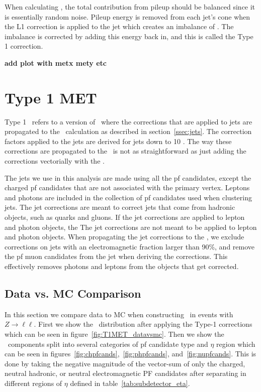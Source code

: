 When calculating \MET, the total contribution from pileup should be balanced since it is essentially random noise.
Pileup energy is removed from each jet's cone when the L1 correction is applied to the jet which creates an imbalance of \MET.
The imbalance is corrected by adding this energy back in, and this is called the Type 1 correction.

{\bf add plot with metx mety etc}

\section{Type 1 MET}
\label{sec:t1met}
Type 1 \MET\ refers to a version of \MET\ where the corrections that are applied to jets are propagated to the \MET\ calculation as described in section~\ref{ssec:jets}.
The correction factors applied to the jets are derived for jets down to 10 \gev.
The way these corrections are propagated to the \MET\ is not as straightforward as just adding the corrections vectorially with the \MET.

The jets we use in this analysis are made using all the pf candidates, except the charged pf candidates that are not associated with the primary vertex.
Leptons and photons are included in the collection of pf candidates used when clustering jets.
The jet corrections are meant to correct jets that come from hadronic objects, such as quarks and gluons.
If the jet corrections are applied to lepton and photon objects, the
The jet corrections are not meant to be applied to lepton and photon objects.
When propagating the jet corrections to the \MET, we exclude corrections on jets with an electromagnetic fraction larger than 90\%,
and remove the pf muon candidates from the jet when deriving the corrections.
This effectively removes photons and leptons from the objects that get corrected.

\subsection{Data vs. MC Comparison}
In this section we compare data to MC when constructing \MET\ in events with $Z\rightarrow\ell\ell$.
First we show the \MET\ distribution after applying the Type-1 corrections which can be seen in figure~\ref{fig:T1MET_datavsmc}.
Then we show the \MET\ components split into several categories of pf candidate type and $\eta$ region
which can be seen in figures~\ref{fig:chpfcands},~\ref{fig:phpfcands}, and~\ref{fig:nupfcands}. 
This is done by taking the negative magnitude of the vector-sum of only the charged, neutral hadronic, or neutral electromagnetic PF candidates
after separating in different regions of $\eta$ defined in table~\ref{tab:subdetector_eta}.

